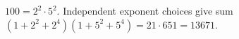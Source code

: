$100=2^2\cdot5^2$. Independent exponent choices give sum $(1+2^2+2^4)(1+5^2+5^4)=21\cdot651=\boxed{13671}$.
